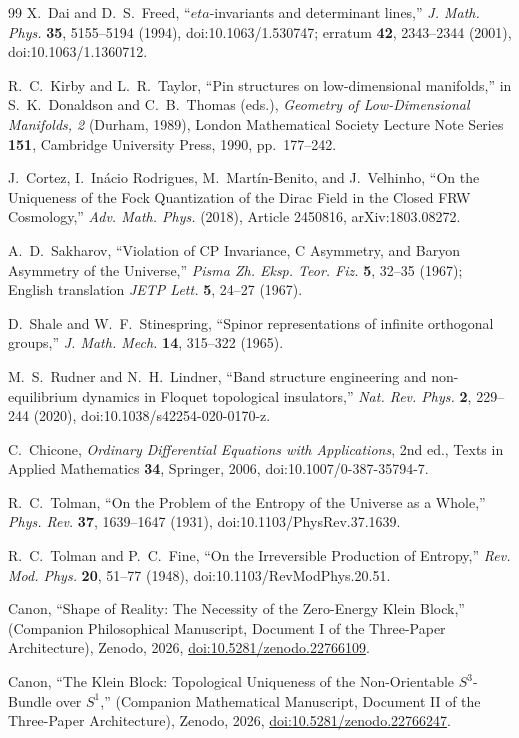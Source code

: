 \documentclass[11pt]{article}
\theoremstyle{canonmath}
\theoremstyle{canonpostulate}
\theoremstyle{canonclaim}
\def\eta{eta}%
\begin{document}
\begin{thebibliography}{99}
X.~Dai and D.~S.~Freed, ``$\eta$-invariants and determinant lines,'' \textit{J. Math. Phys.} \textbf{35}, 5155--5194 (1994), doi:10.1063/1.530747; erratum \textbf{42}, 2343--2344 (2001), doi:10.1063/1.1360712.

R.~C.~Kirby and L.~R.~Taylor, ``Pin structures on low-dimensional manifolds,'' in S.~K.~Donaldson and C.~B.~Thomas (eds.), \textit{Geometry of Low-Dimensional Manifolds, 2} (Durham, 1989), London Mathematical Society Lecture Note Series \textbf{151}, Cambridge University Press, 1990, pp.~177--242.

J.~Cortez, I.~In\'acio Rodrigues, M.~Mart\'in-Benito, and J.~Velhinho, ``On the Uniqueness of the Fock Quantization of the Dirac Field in the Closed FRW Cosmology,'' \textit{Adv. Math. Phys.} (2018), Article 2450816, arXiv:1803.08272.

A.~D.~Sakharov, ``Violation of CP Invariance, C Asymmetry, and Baryon Asymmetry of the Universe,'' \textit{Pisma Zh. Eksp. Teor. Fiz.} \textbf{5}, 32--35 (1967); English translation \textit{JETP Lett.} \textbf{5}, 24--27 (1967).

D.~Shale and W.~F.~Stinespring, ``Spinor representations of infinite orthogonal groups,'' \textit{J. Math. Mech.} \textbf{14}, 315--322 (1965).

M.~S.~Rudner and N.~H.~Lindner, ``Band structure engineering and non-equilibrium dynamics in Floquet topological insulators,'' \textit{Nat. Rev. Phys.} \textbf{2}, 229--244 (2020), doi:10.1038/s42254-020-0170-z.

C.~Chicone, \textit{Ordinary Differential Equations with Applications}, 2nd ed., Texts in Applied Mathematics \textbf{34}, Springer, 2006, doi:10.1007/0-387-35794-7.

R.~C.~Tolman, ``On the Problem of the Entropy of the Universe as a Whole,'' \textit{Phys. Rev.} \textbf{37}, 1639--1647 (1931), doi:10.1103/PhysRev.37.1639.

R.~C.~Tolman and P.~C.~Fine, ``On the Irreversible Production of Entropy,'' \textit{Rev. Mod. Phys.} \textbf{20}, 51--77 (1948), doi:10.1103/RevModPhys.20.51.

Canon, ``Shape of Reality: The Necessity of the Zero-Energy Klein Block,'' (Companion Philosophical Manuscript, Document I of the Three-Paper Architecture), Zenodo, 2026, \href{https://doi.org/10.5281/zenodo.22766109}{doi:10.5281/zenodo.22766109}.

Canon, ``The Klein Block: Topological Uniqueness of the Non-Orientable $S^3$-Bundle over $S^1$,'' (Companion Mathematical Manuscript, Document II of the Three-Paper Architecture), Zenodo, 2026, \href{https://doi.org/10.5281/zenodo.22766247}{doi:10.5281/zenodo.22766247}.

\end{thebibliography}
\end{document}
